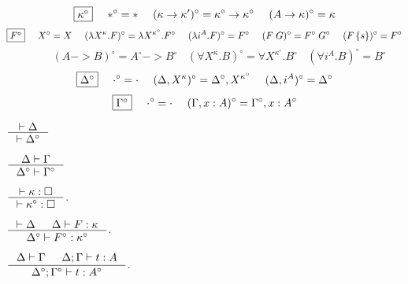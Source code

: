 \paragraph{}
\begin{definition}
\[ \fbox{$\kappa^\circ$}
 ~~~~
 *^\circ =
 *
 ~~~~
 (\kappa -> \kappa')^\circ =
 \kappa^\circ -> \kappa^\circ
 ~~~~
 (A -> \kappa)^\circ =
 \kappa
\]
\[ \fbox{$F^\circ$}
 ~~~~
 X^\circ =
 X
 ~~~~
 (\lambda X^\kappa.F)^\circ =
 \lambda X^{\kappa^\circ}.F^\circ
 ~~~~
 (\lambda i^A.F)^\circ =
 F^\circ
 ~~~~
 (F\;G)^\circ =
 F^\circ\;G^\circ
 ~~~~
 (F\,\{s\})^\circ =
 F^\circ
\]
\[ ~~~~ ~~~~ ~~~~
 (A -> B)^\circ =
 A^\circ -> B^\circ
 ~~~~
 (\forall X^\kappa . B)^\circ =
 \forall X^{\kappa^\circ} . B^\circ
 ~~~~
 (\forall i^A . B)^\circ =
 B^\circ
\]
\[ \fbox{$\Delta^\circ$}
 ~~~~
 \cdot^\circ = \cdot
 ~~~~
 (\Delta,X^\kappa)^\circ = \Delta^\circ,X^{\kappa^\circ}
 ~~~~
 (\Delta,i^A)^\circ = \Delta^\circ
\]
\[ \fbox{$\Gamma^\circ$}
 ~~~~
 \cdot^\circ = \cdot
 ~~~~
 (\Gamma,x:A)^\circ = \Gamma^\circ,x:A^\circ
\]
\end{definition}

\begin{lemma}
	$\inference{|- \Delta}{|- \Delta^\circ}$
\end{lemma}

\begin{lemma}
	$\inference{\Delta |- \Gamma}{\Delta^\circ |- \Gamma^\circ}$
\end{lemma}

\begin{theorem}
	$\inference{|- \kappa : \square}{|- \kappa^\circ : \square}$.
\end{theorem}

\begin{theorem}
	$\inference{|- \Delta & \Delta |- F : \kappa}
		{\Delta^\circ |- F^\circ : \kappa^\circ}$.
\end{theorem}

\begin{theorem}
	$\inference{\Delta |- \Gamma & \Delta;\Gamma |- t : A}
		{\Delta^\circ;\Gamma^\circ |- t : A^\circ}$.
\end{theorem}



